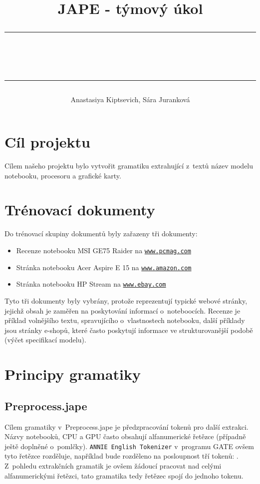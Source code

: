 \documentclass[a4,12pt]{article}
\title{
JAPE - týmový úkol\\
\begin{spacing}{0.1}
\noindent
\rule{\linewidth}{0.3pt}\\\rule{\linewidth}{0.9pt}
\end{spacing}
\rule[75pt]{0pt}{0pt}
}
\author{Anastasiya Kiptsevich, Sára Juranková }
\let\Oldsection\section
\renewcommand{\section}{\FloatBarrier\Oldsection}
\let\Oldsubsection\subsection
\renewcommand{\subsection}{\FloatBarrier\Oldsubsection}
\begin{document}
\maketitle
\tableofcontents

\newpage
\section{Cíl projektu}
Cílem našeho projektu bylo vytvořit gramatiku extrahující z~textů název modelu notebooku, procesoru a  grafické karty.
\section{Trénovací dokumenty}
Do trénovací skupiny dokumentů byly zařazeny tři dokumenty:
\begin{itemize}
\item Recenze notebooku MSI GE75 Raider na \href{https://www.pcmag.com/review/367363/msi-ge75-raider}{\texttt{www.pcmag.com}}
\item Stránka notebooku Acer Aspire E 15 na \href{https://www.amazon.com/Acer-Aspire-i3-8130U-Memory-E5-576-392H/dp/B079TGL2BZ/}{\texttt{www.amazon.com}}
\item Stránka notebooku HP Stream na \href{https://www.ebay.com/itm/NEW-HP-Stream-14-Laptop-Celeron-N3060-4GB-RAM-32GB-SSD-Windows-10/323484448208?var=512535004668&fbclid=IwAR1-YBPLIUAlaY6gOSYBQOsmyb3mCOY8J6BuRLOxIC3l2n_n4U44I_ixgeI}{\texttt{www.ebay.com}}
\end{itemize}
Tyto tři dokumenty byly vybrány, protože reprezentují typické webové stránky, jejichž obsah je zaměřen na poskytování informací o~noteboocích. Recenze je příklad volnějšího textu, spravujícího o~vlastnostech notebooku, další příklady jsou stránky e-shopů, které často poskytují informace ve strukturovanější podobě (výčet specifikací modelu). 

\section{Principy gramatiky}
\subsection{Preprocess.jape}
Cílem gramatiky v~Preprocess.jape je předzpracování tokenů pro další extrakci. Názvy notebooků, CPU a GPU často obsahují alfanumerické řetězce (případně ještě doplněné o~pomlčky). \texttt{ANNIE English Tokenizer} v~programu GATE ovšem tyto řetězce rozděluje, například  bude rozděleno na posloupnost tří tokenů:   . Z~pohledu extrakčních gramatik je ovšem žádoucí pracovat nad celými alfanumerickými řetězci, tato gramatika tedy řetězec  spojí do jednoho tokenu.
\end{document}
